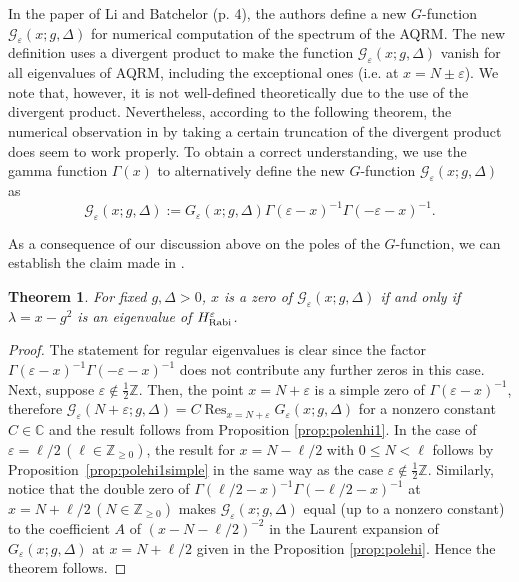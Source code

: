 \documentclass[11pt]{article}
\numberwithin{equation}{section}
\newcommand{\Z}{\mathbb{Z}} %
\newcommand{\C}{\mathbb{C}} %
\newcommand{\e}{\varepsilon}
\newcommand{\HRabi}[1]{H_{\text{\upshape Rabi}}^{#1}} %
\DeclareMathOperator*{\Res}{Res} %
\theoremstyle{plain}
\newtheorem{thm}{Theorem}[section]
\theoremstyle{definition}
\theoremstyle{remark}
\begin{document}
\;

In the paper of Li and Batchelor \cite{LB2016JPA}(p. 4), the authors define a new $G$-function $\mathcal{G}_\e(x;g,\Delta)$
for numerical computation of the spectrum of the AQRM. The new definition uses a divergent product to make the function
$\mathcal{G}_\e(x;g,\Delta)$ vanish for all eigenvalues of AQRM, including the exceptional ones (i.e. at \(x = N \pm \e\)).
We note that, however, it is not well-defined theoretically due to the use of the divergent product. Nevertheless, according to the
following theorem, the numerical observation in \cite{LB2016JPA} by taking a certain truncation of the divergent product does seem to work
properly. To obtain a correct understanding, we use the gamma function $\Gamma(x)$ to alternatively define the new $G$-function $\mathcal{G}_\e(x;g,\Delta)$ as
\begin{equation}\label{eq:neqG}
  \mathcal{G}_\e(x;g,\Delta) := G_\e(x;g,\Delta)\Gamma(\e-x)^{-1}\Gamma(-\e-x)^{-1}.
\end{equation}

As a consequence of our discussion above on the poles of the $G$-function, we can establish the claim made in \cite{LB2016JPA}.

\begin{thm} \label{thm:LBcomp}
  For fixed \(g,\Delta>0\), \(x\) is a zero of \(\mathcal{G}_\e(x;g,\Delta)\) if and only if \(\lambda = x - g^2 \) is an eigenvalue of  \(\HRabi{\e}\).
\end{thm}

\begin{proof}
  The statement  for regular eigenvalues is clear since the factor $\Gamma(\e-x)^{-1}\Gamma(-\e-x)^{-1}$ does not contribute any further zeros in this case.
  Next, suppose \(\e \not\in \frac12 \Z\). Then, the point \(x = N+\e \) is a simple zero of
  \(\Gamma{(\e-x)}^{-1} \), therefore \(\mathcal{G}_\e(N+\e;g,\Delta) = C \Res_{x = N+\e} G_\e (x;g,\Delta) \) for
  a nonzero constant \(C \in \C \) and the result follows from Proposition \ref{prop:polenhi1}.
    In the case of \( \e = \ell/2 \, (\ell \in \Z_{\geq 0})\), the result for \(x = N - \ell/2\) with \(0 \leq N < \ell\) follows by
    Proposition~\ref{prop:polehi1simple} in the same way as the case \(\e \not\in \frac12 \Z \). Similarly,
    notice that the double zero of \(\Gamma(\ell/2-x)^{-1}\Gamma(-\ell/2-x)^{-1}\) at \(x = N +\ell/2 \, (N \in \Z_{\geq 0}) \) makes
    \(\mathcal{G}_\e(x;g,\Delta)\) equal (up to a nonzero constant) to the coefficient $A$ of \((x-N-\ell/2)^{-2}\) in the Laurent expansion
    of \(G_\e(x;g,\Delta)\) at \(x= N+ \ell/2 \) given in the Proposition \ref{prop:polehi}. Hence the theorem follows. 
\end{proof}
\end{document}
